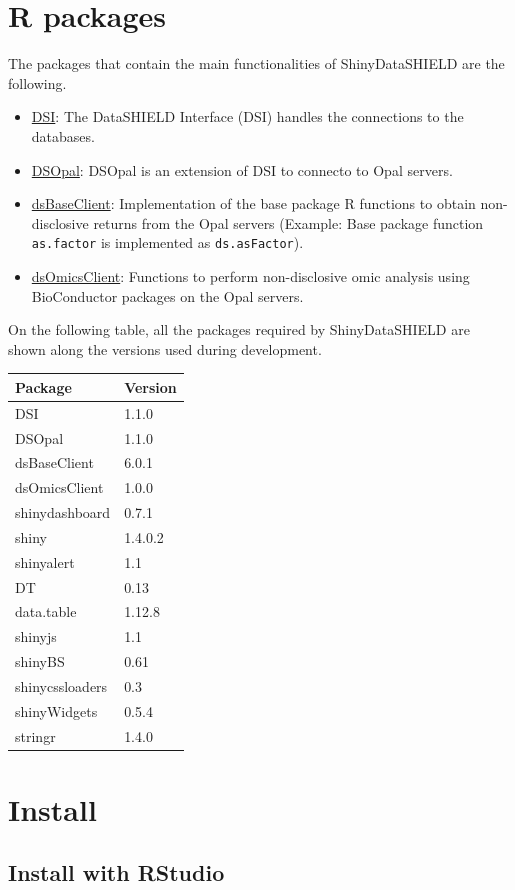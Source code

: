 \documentclass[
]{book}
\providecommand{\tightlist}{%
  \setlength{\itemsep}{0pt}\setlength{\parskip}{0pt}}
\begin{document}
\hypertarget{r-packages}{%
\section{R packages}\label{r-packages}}

The packages that contain the main functionalities of ShinyDataSHIELD are the following.

\begin{itemize}
\tightlist
\item
  \href{https://github.com/datashield/DSI}{DSI}: The DataSHIELD Interface (DSI) handles the connections to the databases.
\item
  \href{https://github.com/datashield/DSOpal}{DSOpal}: DSOpal is an extension of DSI to connecto to Opal servers.
\item
  \href{https://github.com/datashield/dsBaseClient}{dsBaseClient}: Implementation of the base package R functions to obtain non-disclosive returns from the Opal servers (Example: Base package function \texttt{as.factor} is implemented as \texttt{ds.asFactor}).
\item
  \href{https://github.com/isglobal-brge/dsOmicsClient}{dsOmicsClient}: Functions to perform non-disclosive omic analysis using BioConductor packages on the Opal servers.
\end{itemize}

On the following table, all the packages required by ShinyDataSHIELD are shown along the versions used during development.

\begin{longtable}[]{@{}ll@{}}
\toprule
Package & Version\tabularnewline
\midrule
\endhead
DSI & 1.1.0\tabularnewline
DSOpal & 1.1.0\tabularnewline
dsBaseClient & 6.0.1\tabularnewline
dsOmicsClient & 1.0.0\tabularnewline
shinydashboard & 0.7.1\tabularnewline
shiny & 1.4.0.2\tabularnewline
shinyalert & 1.1\tabularnewline
DT & 0.13\tabularnewline
data.table & 1.12.8\tabularnewline
shinyjs & 1.1\tabularnewline
shinyBS & 0.61\tabularnewline
shinycssloaders & 0.3\tabularnewline
shinyWidgets & 0.5.4\tabularnewline
stringr & 1.4.0\tabularnewline
\bottomrule
\end{longtable}

\hypertarget{install}{%
\section{Install}\label{install}}

\hypertarget{install-with-rstudio}{%
\subsection{Install with RStudio}\label{install-with-rstudio}}
\end{document}
